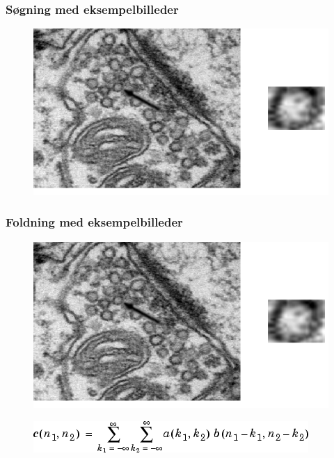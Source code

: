 \begin{frame}
\frametitle{Søgning med eksempelbilleder}
\begin{figure}[H]
	\centering
	\includegraphics[scale=0.4]{img/finalmethod/cell2.png}
\end{figure}
\end{frame}

\begin{frame}
\frametitle{Foldning med eksempelbilleder}
\begin{figure}[H]
	\centering
	\includegraphics[scale=0.4]{img/finalmethod/cell2.png}
\end{figure}
\begin{figure}[H]
	\centering
	\includegraphics[scale=0.6]{img/finalmethod/math_c5.png}
\end{figure}
\end{frame}

